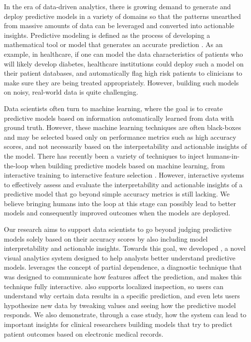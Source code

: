 

In the era of data-driven analytics, there is growing demand to generate and deploy predictive models in a variety of domains so that the patterns unearthed from massive amounts of data can be leveraged
and converted into actionable insights.
Predictive modeling is defined as the process of developing a mathematical tool or model that generates an accurate prediction \cite{kuhn2013applied}.  As an example, in healthcare, if one can model the data characteristics of patients who will likely develop diabetes, healthcare institutions could deploy such a model on their patient databases, and automatically flag high risk patients to clinicians to make sure they are being treated appropriately.  However, building such models on noisy, real-world data is quite challenging.  

Data scientists often turn to machine learning, where the goal is to create predictive models based on information automatically learned from data with ground truth.  However, these machine learning techniques are often black-boxes and may be selected based only on performance metrics such as high accuracy scores, and not necessarily based on the interpretability and actionable insights of the model.  There has recently been a variety of techniques to inject humans-in-the-loop when building predictive models based on machine learning, from interactive training \cite{export:241307} to interactive feature selection \cite{infuse}.  However, interactive systems to effectively assess and evaluate the interpretability and actionable insights of a predictive model that go beyond simple accuracy metrics is still lacking.  We believe bringing humans into the loop at this stage can possibly lead to better models and consequently improved outcomes when the models are deployed.

Our research aims to support data scientists to go beyond judging predictive models solely based on their accuracy scores by also including model interpretability and actionable insights.  Towards this goal, we developed \prospector, a novel visual analytics system designed to help analysts better understand  predictive models.  \prospector leverages the concept of partial dependence, a diagnostic technique that was designed to communicate how features affect the prediction, and makes this technique fully interactive.  \prospector also supports localized inspection, so users can understand why certain data results in a specific prediction, and even lets users hypothesize new data by tweaking values and seeing how the predictive model responds.  We also demonstrate, through a case study, how the system can lead to important insights for clinical researchers building models that try to predict patient outcomes based on electronic medical records.

